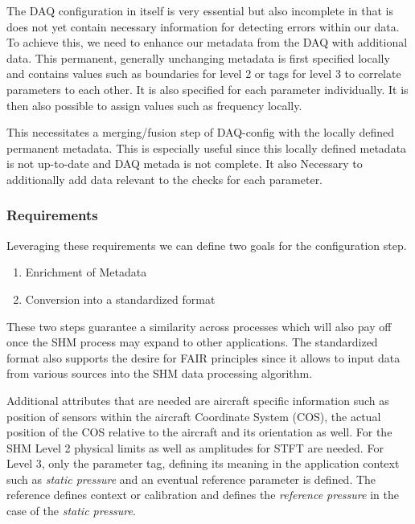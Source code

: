 
The DAQ configuration in itself is very essential but also incomplete in that is does not yet contain necessary information for detecting errors within our data. To achieve this, we need to enhance our metadata from the DAQ with additional data. This permanent, generally unchanging metadata is first specified locally and contains values such as boundaries for level 2 or tags for level 3 to correlate parameters to each other. It is also specified for each parameter individually. It is then also possible to assign values such as frequency locally.



This necessitates a merging/fusion step of DAQ-config with the locally defined permanent metadata. This is especially useful since this locally defined metadata is not up-to-date and DAQ metada is not complete. It also Necessary to additionally add data relevant to the checks for each parameter.


\subsubsection{Requirements}

Leveraging these requirements we can define two goals for the configuration step.
\begin{enumerate}
    \item Enrichment of Metadata
    \item Conversion into a standardized format
\end{enumerate}
These two steps guarantee a similarity across processes which will also pay off once the SHM process may expand to other applications. The standardized format also supports the desire for FAIR principles since it allows to input data from various sources into the SHM data processing algorithm.

Additional attributes that are needed are aircraft specific information such as position of sensors within the aircraft Coordinate System (COS), the actual position of the COS relative to the aircraft and its orientation as well. For the SHM Level 2 physical limits as well as amplitudes for STFT are needed. For Level 3, only the parameter tag, defining its meaning in the application context such as \textit{static pressure} and an eventual reference parameter is defined. The reference defines context or calibration and defines the \textit{reference pressure} in the case of the \textit{static pressure}.

